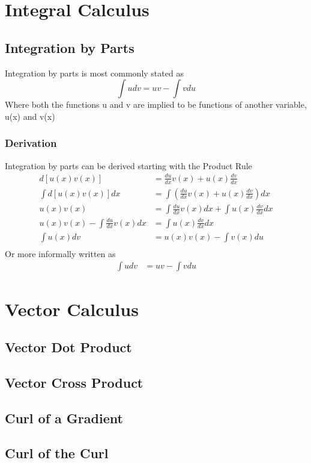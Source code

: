 \documentclass[11pt]{book}
\begin{document}
\chapter{Integral Calculus}

\section{Integration by Parts}
Integration by parts is most commonly stated as
\[\int{udv} = uv - \int{vdu}\]
Where both the functions u and v are implied to be functions of another variable, u(x) and v(x)

\subsection{Derivation}
Integration by parts can be derived starting with the Product Rule
\begin{align*}
d\left[ u(x)v(x) \right] &= \frac{du}{dx}v(x) + u(x)\frac{dv}{dx} \\
\int{d\left[ u(x)v(x) \right]dx} &= \int{\left(\frac{du}{dx}v(x) + u(x)\frac{dv}{dx}\right)dx} \\
u(x)v(x) &= \int{\frac{du}{dx}v(x)dx} + \int{u(x)\frac{dv}{dx}dx} \\
u(x)v(x) - \int{\frac{du}{dx}v(x)dx} &=  \int{u(x)\frac{dv}{dx}dx} \\
\int{u(x)dv} &= u(x)v(x) - \int{v(x)du} \\
\end{align*}
Or more informally written as
\begin{align*}
\int{udv} &= uv - \int{vdu} 
\end{align*}

\chapter{Vector Calculus}
\section{Vector Dot Product}
\section{Vector Cross Product}
\section{Curl of a Gradient}
\section{Curl of the Curl}
\end{document}
